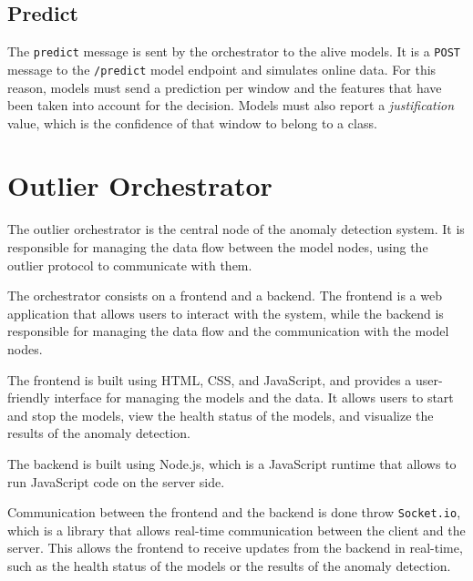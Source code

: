 \subsection{Predict}

The \texttt{predict} message is sent by the orchestrator to the alive models. It is a \texttt{POST} message to the \texttt{/predict} model endpoint and simulates online data. For this reason, models must send a prediction per window and the features that have been taken into account for the decision. Models must also report a \textit{justification} value, which is the confidence of that window to belong to a class.


\section{Outlier Orchestrator}\label{sec:orchestrator}

The outlier orchestrator is the central node of the anomaly detection system. It is responsible for managing the data flow between the model nodes, using the outlier protocol to communicate with them.

The orchestrator consists on a frontend and a backend. The frontend is a web application that allows users to interact with the system, while the backend is responsible for managing the data flow and the communication with the model nodes.

The frontend is built using HTML, CSS, and JavaScript, and provides a user-friendly interface for managing the models and the data. It allows users to start and stop the models, view the health status of the models, and visualize the results of the anomaly detection.

The backend is built using Node.js, which is a JavaScript runtime that allows to run JavaScript code on the server side.

Communication between the frontend and the backend is done throw \texttt{Socket.io}, which is a library that allows real-time communication between the client and the server. This allows the frontend to receive updates from the backend in real-time, such as the health status of the models or the results of the anomaly detection.

